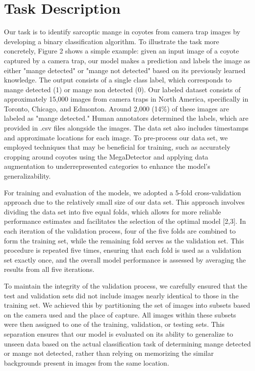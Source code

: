 \documentclass{article}
\begin{document}
\section{Task Description}
Our task is to identify sarcoptic mange in coyotes from camera trap images by developing a binary classification algorithm. To illustrate the task more concretely, Figure 2 shows a simple example: given an input image of a coyote captured by a camera trap, our model makes a prediction and labels the image as either "mange detected" or "mange not detected" based on its previously learned knowledge. The output consists of a single class label, which corresponds to mange detected (1) or mange non detected (0).
Our labeled dataset consists of approximately 15,000 images from camera traps in North America, specifically in Toronto, Chicago, and Edmonton. Around 2,000 (14\%) of these images are labeled as "mange detected." Human annotators determined the labels, which are provided in .csv files alongside the images. The data set also includes timestamps and approximate locations for each image. To pre-process our data set, we employed techniques that may be beneficial for training, such as accurately cropping around coyotes using the MegaDetector and applying data augmentation to underrepresented categories to enhance the model's generalizability.

For training and evaluation of the models, we adopted a 5-fold cross-validation approach due to the relatively small size of our data set. This approach involves dividing the data set into five equal folds, which allows for more reliable performance estimates and facilitates the selection of the optimal model [2,3]. In each iteration of the validation process, four of the five folds are combined to form the training set, while the remaining fold serves as the validation set. This procedure is repeated five times, ensuring that each fold is used as a validation set exactly once, and the overall model performance is assessed by averaging the results from all five iterations.

To maintain the integrity of the validation process, we carefully ensured that the test and validation sets did not include images nearly identical to those in the training set. We achieved this by partitioning the set of images into subsets based on the camera used and the place of capture. All images within these subsets were then assigned to one of the training, validation, or testing sets. This separation ensures that our model is evaluated on its ability to generalize to unseen data based on the actual classification task of determining mange detected or mange not detected, rather than relying on memorizing the similar backgrounds present in images from the same location.
\end{document}
